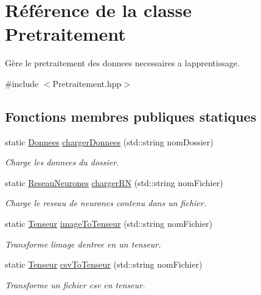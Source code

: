 \hypertarget{class_pretraitement}{}\section{Référence de la classe Pretraitement}
\label{class_pretraitement}


Gère le pretraitement des donnees necessaires a l\textquotesingle{}apprentissage.  




{\ttfamily \#include $<$Pretraitement.\+hpp$>$}

\subsection*{Fonctions membres publiques statiques}
\begin{DoxyCompactItemize}
\item 
static \hyperlink{class_donnees}{Donnees} \hyperlink{class_pretraitement_a5f53fc5ecf4893d40577aceb269e97b5}{charger\+Donnees} (std\+::string nom\+Dossier)
\begin{DoxyCompactList}\small\item\em Charge les donnees du dossier. \end{DoxyCompactList}\item 
static \hyperlink{class_reseau_neurones}{Reseau\+Neurones} \hyperlink{class_pretraitement_a2d1e9cdbe1b865565f63c435923ec8e3}{charger\+RN} (std\+::string nom\+Fichier)
\begin{DoxyCompactList}\small\item\em Charge le reseau de neurones contenu dans un fichier. \end{DoxyCompactList}\item 
static \hyperlink{class_tenseur}{Tenseur} \hyperlink{class_pretraitement_a98c809577fe15166c5a9be25daff64a1}{image\+To\+Tenseur} (std\+::string nom\+Fichier)
\begin{DoxyCompactList}\small\item\em Transforme l\textquotesingle{}image d\textquotesingle{}entree en un tenseur. \end{DoxyCompactList}\item 
static \hyperlink{class_tenseur}{Tenseur} \hyperlink{class_pretraitement_a588810b1b86e11464cea64443358ae5a}{csv\+To\+Tenseur} (std\+::string nom\+Fichier)
\begin{DoxyCompactList}\small\item\em Transforme un fichier csv en tenseur. \end{DoxyCompactList}\item 

\end{DoxyCompactItemize}
